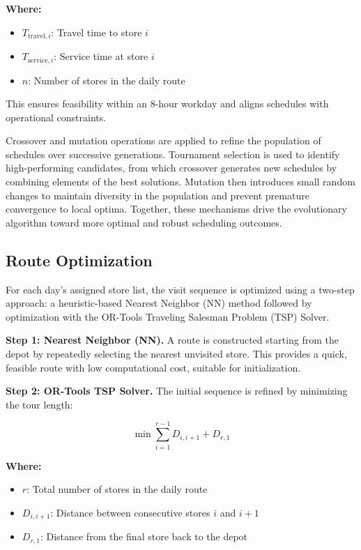 \textbf{Where:}
\begin{itemize}
  \item $T_{\text{travel},i}$: Travel time to store $i$
  \item $T_{\text{service},i}$: Service time at store $i$
  \item $n$: Number of stores in the daily route
\end{itemize}
This ensures feasibility within an 8-hour workday and aligns schedules with operational constraints.

Crossover and mutation operations are applied to refine the population of schedules over successive generations. Tournament selection is used to identify high-performing candidates, from which crossover generates new schedules by combining elements of the best solutions. Mutation then introduces small random changes to maintain diversity in the population and prevent premature convergence to local optima. Together, these mechanisms drive the evolutionary algorithm toward more optimal and robust scheduling outcomes.

\subsection{Route Optimization}

For each day’s assigned store list, the visit sequence is optimized using a two-step approach: a heuristic-based Nearest Neighbor (NN) method followed by optimization with the OR-Tools Traveling Salesman Problem (TSP) Solver.

\textbf{Step 1: Nearest Neighbor (NN).} A route is constructed starting from the depot by repeatedly selecting the nearest unvisited store. This provides a quick, feasible route with low computational cost, suitable for initialization.

\textbf{Step 2: OR-Tools TSP Solver.} The initial sequence is refined by minimizing the tour length:

\[
\min \sum_{i=1}^{r-1} D_{i,i+1} + D_{r,1}
\]

\textbf{Where:}
\begin{itemize}
  \item $r$: Total number of stores in the daily route
  \item $D_{i,i+1}$: Distance between consecutive stores $i$ and $i+1$
  \item $D_{r,1}$: Distance from the final store back to the depot
\end{itemize}


